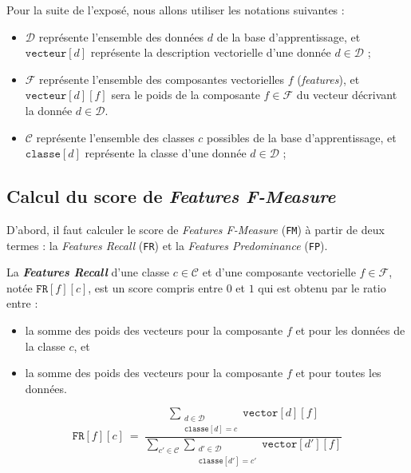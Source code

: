 	Pour la suite de l'exposé, nous allons utiliser les notations suivantes :
	\begin{itemize}
		\item $\mathcal{D}$ représente l'ensemble des données $d$ de la base d'apprentissage,
		et $\texttt{vecteur}[d]$ représente la description vectorielle d'une donnée $d \in \mathcal{D}$ ;
		\item $\mathcal{F}$ représente l'ensemble des composantes vectorielles $f$ (\textit{features}),
		et $\texttt{vecteur}[d][f]$ sera le poids de la composante $f \in \mathcal{F}$ du vecteur décrivant la donnée $d \in \mathcal{D}$.
		\item $\mathcal{C}$ représente l'ensemble des classes $c$ possibles de la base d'apprentissage,
		et $\texttt{classe}[d]$ représente la classe d'une donnée $d \in \mathcal{D}$ ;
	\end{itemize}
	
	
	\subsection{Calcul du score de \textit{Features F-Measure}}
	\label{annex:C.3.1-DESCRIPTION-IMPLEMENTATION-FEATURES-MAXIMIZATION-METRIC-CALCUL-FMEASURE}
	
		D'abord, il faut calculer le score de \textit{Features F-Measure} (\texttt{FM}) à partir de deux termes : la \textit{Features Recall} (\texttt{FR}) et la \textit{Features Predominance} (\texttt{FP}).
		\newline
		
		
		
		La \textbf{\textit{Features Recall}} d'une classe $c \in \mathcal{C}$ et d'une composante vectorielle $f \in \mathcal{F}$, notée $\texttt{FR}[f][c]$, est un score compris entre $0$ et $1$ qui est obtenu par le ratio entre :
		\begin{itemize}
			\item la somme des poids des vecteurs pour la composante $f$ et pour les données de la classe $c$, et
			\item la somme des poids des vecteurs pour la composante $f$ et pour toutes les données.
		\end{itemize}
		
		\begin{equation}
			\label{equation:C.3.1-DESCRIPTION-IMPLEMENTATION-FEATURES-MAXIMIZATION-METRIC-FEATURES-RECALL}
			\texttt{FR}[f][c]~=~\frac{
				\sum\limits_{
					\substack{
						d \in \mathcal{D} \\
						\texttt{classe}[d]=c
					}
				} \texttt{vector}[d][f]
			}{
				\sum\limits_{
					c' \in \mathcal{C}
				}
				\sum\limits_{
					\substack{
						d' \in \mathcal{D} \\
						\texttt{classe}[d']=c'
					}
				} \texttt{vector}[d'][f]
			}
		\end{equation}
		

